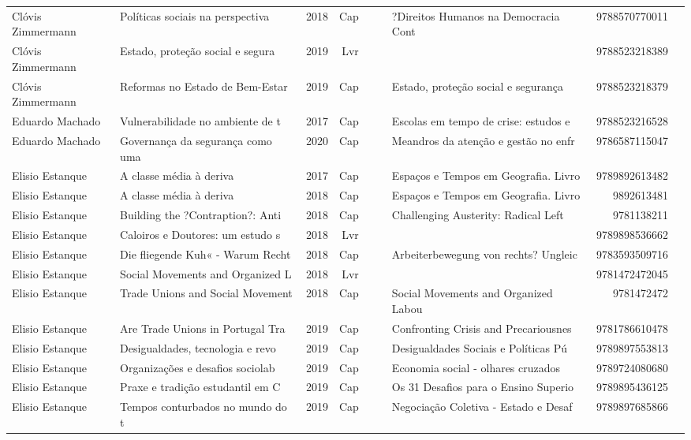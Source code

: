 \documentclass[12pt,brazil]{article}\usepackage[]{graphicx}\usepackage[]{xcolor}
\begin{document}
\begin{longtable}{lllrrllrr}
Clóvis Zimmermann & Políticas sociais na perspectiva & 2018 & Cap &  &  & ?Direitos Humanos na Democracia Cont & 9788570770011 \\
\rowcolor{ninval}Clóvis Zimmermann & Estado, proteção social e segura & 2019 & Lvr &  &  &  & 9788523218389 \\
Clóvis Zimmermann & Reformas no Estado de Bem-Estar  & 2019 & Cap &  &  & Estado, proteção social e segurança  & 9788523218379 \\
Eduardo Machado & Vulnerabilidade no ambiente de t & 2017 & Cap &  &  & Escolas em tempo de crise: estudos e & 9788523216528 \\
Eduardo Machado & Governança da segurança como uma & 2020 & Cap &  &  & Meandros da atenção e gestão no enfr & 9786587115047 \\
Elisio Estanque & A classe média à deriva & 2017 & Cap &  &  & Espaços e Tempos em Geografia. Livro & 9789892613482 \\
\rowcolor{duplic}Elisio Estanque & A classe média à deriva & 2018 & Cap &  &  & Espaços e Tempos em Geografia. Livro & 9892613481 \\
Elisio Estanque & Building the ?Contraption?: Anti & 2018 & Cap &  &  & Challenging Austerity: Radical Left  & 9781138211 \\
Elisio Estanque & Caloiros e Doutores: um estudo s & 2018 & Lvr &  &  &  & 9789898536662 \\
Elisio Estanque & Die fliegende Kuh« - Warum Recht & 2018 & Cap &  &  & Arbeiterbewegung von rechts? Ungleic & 9783593509716 \\
Elisio Estanque & Social Movements and Organized L & 2018 & Lvr &  &  &  & 9781472472045 \\
Elisio Estanque & Trade Unions and Social Movement & 2018 & Cap &  &  & Social Movements and Organized Labou & 9781472472 \\
Elisio Estanque & Are Trade Unions in Portugal Tra & 2019 & Cap &  &  & Confronting Crisis and Precariousnes & 9781786610478 \\
Elisio Estanque & Desigualdades, tecnologia e revo & 2019 & Cap &  &  & Desigualdades Sociais e Políticas Pú & 9789897553813 \\
Elisio Estanque & Organizações e desafios sociolab & 2019 & Cap &  &  & Economia social - olhares cruzados & 9789724080680 \\
Elisio Estanque & Praxe e tradição estudantil em C & 2019 & Cap &  &  & Os 31 Desafios para o Ensino Superio & 9789895436125 \\
Elisio Estanque & Tempos conturbados no mundo do t & 2019 & Cap &  &  & Negociação Coletiva - Estado e Desaf & 9789897685866 \\

\end{longtable}
\end{document}
